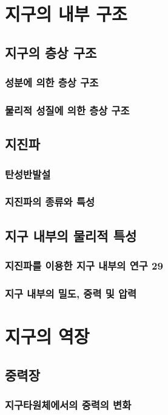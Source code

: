 \section{지구의 내부 구조}\index{}
\subsection{지구의 층상 구조}\index{}
\subsubsection{성분에 의한 층상 구조}\index{}
\subsubsection{물리적 성질에 의한 층상 구조}\index{}
	
\subsection{지진파}\index{}
\subsubsection{탄성반발설}\index{}
\subsubsection{지진파의 종류와 특성}\index{}

\subsection{지구 내부의 물리적 특성}\index{}
\subsubsection{지진파를 이용한 지구 내부의 연구 29 }\index{}
\subsubsection{지구 내부의 밀도, 중력 및 압력}\index{}


\section{지구의 역장}\index{}
\subsection{중력장}\index{}
\subsubsection{지구타원체에서의 중력의 변화}\index{}
